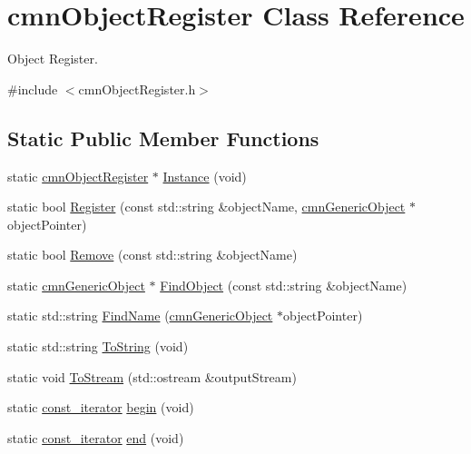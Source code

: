 \hypertarget{classcmn_object_register}{}\section{cmn\+Object\+Register Class Reference}
\label{classcmn_object_register}


Object Register.  




{\ttfamily \#include $<$cmn\+Object\+Register.\+h$>$}

\subsection*{Static Public Member Functions}
\begin{DoxyCompactItemize}
\item 
static \hyperlink{classcmn_object_register}{cmn\+Object\+Register} $\ast$ \hyperlink{classcmn_object_register_a12ce3c182ea66df7bebf73f784c5770f}{Instance} (void)
\item 
static bool \hyperlink{classcmn_object_register_a21c87771e997e5bca1a77133617abd00}{Register} (const std\+::string \&object\+Name, \hyperlink{classcmn_generic_object}{cmn\+Generic\+Object} $\ast$object\+Pointer)
\item 
static bool \hyperlink{classcmn_object_register_a934f23a8263be0c00f296264cf0f6ac1}{Remove} (const std\+::string \&object\+Name)
\item 
static \hyperlink{classcmn_generic_object}{cmn\+Generic\+Object} $\ast$ \hyperlink{classcmn_object_register_aefc1a04d23806ff8fc6898d766c6931e}{Find\+Object} (const std\+::string \&object\+Name)
\item 
static std\+::string \hyperlink{classcmn_object_register_ab8d39517f6c72d2378e908bca5c387cd}{Find\+Name} (\hyperlink{classcmn_generic_object}{cmn\+Generic\+Object} $\ast$object\+Pointer)
\item 
static std\+::string \hyperlink{classcmn_object_register_a4d0d4cbd1bba936b0ddd3960c9b72ec3}{To\+String} (void)
\item 
static void \hyperlink{classcmn_object_register_a30d8a46ef78f91f1989d5cc6c11bca16}{To\+Stream} (std\+::ostream \&output\+Stream)
\item 
static \hyperlink{classcmn_object_register_a660d73b1be5af069a8f09606a5819d2e}{const\+\_\+iterator} \hyperlink{classcmn_object_register_a4e9e6c7c6c08f697bdd948fdcfc89dd7}{begin} (void)
\item 
static \hyperlink{classcmn_object_register_a660d73b1be5af069a8f09606a5819d2e}{const\+\_\+iterator} \hyperlink{classcmn_object_register_a3bd6326b5cd733036d53ea4532a7d8a1}{end} (void)
\end{DoxyCompactItemize}
